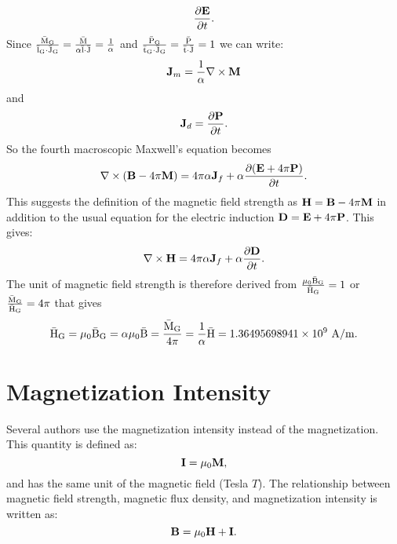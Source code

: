 \documentclass[12pt,a4paper,twoside]{report}
\def\barhg{1.36495698941\times 10^{9}}
\begin{document}
{{\begin{equation}
{\partial {\bf E} \over \partial t}.
\end{equation}
Since ${{\rm \bar M_G} \over {\rm \bar l_G}\cdot {\rm \bar J_G}}=
{{\rm \bar M} \over \alpha {\rm \bar l}\cdot {\rm \bar J}}=
{1\over \alpha}$ and 
${{\rm \bar P_G} \over {\rm \bar t_G}\cdot {\rm \bar J_G}}={{\rm \bar P} \over {\rm \bar t}\cdot {\rm \bar J}}=1$ we
can write:
\begin{equation}
{\bf J}_m={1\over \alpha} \nabla \times {\bf M}
\end{equation}
and 
\begin{equation}
{\bf J}_d={\partial {\bf P} \over \partial t}.
\end{equation}
So the fourth macroscopic Maxwell's equation becomes
\begin{equation}
\nabla \times ({\bf B}-4\pi {\bf M})= 4 \pi \alpha {\bf J}_f + \alpha
{\partial ({\bf E}+4\pi {\bf P}) \over \partial t}.
\end{equation}
This suggests the definition of the magnetic field strength as
${\bf H}={\bf B}-4 \pi {\bf M}$ in addition to the usual equation 
for the electric induction ${\bf D} = {\bf E}+4\pi {\bf P}$. 
This gives:
\begin{equation}
\nabla \times {\bf H}= 4 \pi \alpha {\bf J}_f + \alpha
{\partial {\bf D} \over \partial t}.
\end{equation}
The unit of magnetic field strength is therefore derived from
${\mu_0 {\rm \bar B_G} \over {\rm \bar H_G}}=1$ or ${{\rm \bar M_G} \over {\rm \bar H_G}}=4 \pi$ that
gives
\begin{equation}
{\rm \bar H_G} = \mu_0 {\rm \bar B_G}=\alpha \mu_0 {\rm \bar B}={{\rm \bar M_G} \over 4 \pi}= 
{1\over \alpha} {\rm \bar H}=\barhg\ {\rm A}/{\rm m}.
\end{equation}
}
\newpage

{\color{dark-blue}\chapter{Magnetization Intensity}}

Several authors use the magnetization intensity instead of the
magnetization. This quantity is defined as:
\begin{equation}
{\bf I}=\mu_0 {\bf M},
\end{equation}
and has the same unit of the magnetic field (Tesla $T$). 
The relationship between magnetic field strength, magnetic flux
density, and magnetization intensity is written as:
\begin{equation}
{\bf B}= \mu_0 {\bf H} + {\bf I}.
\end{equation} 

}
\end{document}
